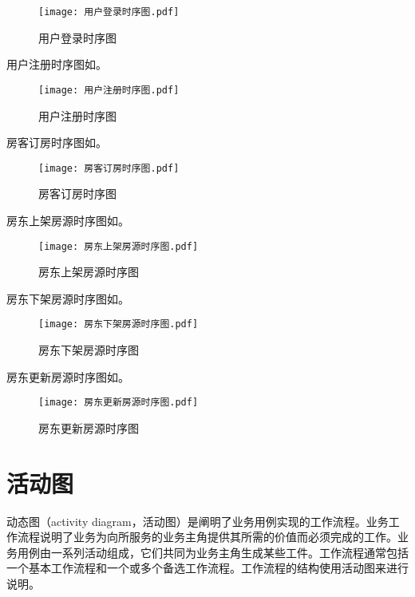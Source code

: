\documentclass[lang=cn,11pt,a4paper,cite=authoryear]{elegantpaper}
\begin{document}
\begin{figure}[]
    \centering
    \texttt{[image: 用户登录时序图.pdf]}
    \caption{用户登录时序图}
    \label{fig:用户登录时序图}
\end{figure}

用户注册时序图如。

\begin{figure}[]
    \centering
    \texttt{[image: 用户注册时序图.pdf]}
    \caption{用户注册时序图}
    \label{fig:用户注册时序图}
\end{figure}

房客订房时序图如。


\begin{figure}[]
    \centering
    \texttt{[image: 房客订房时序图.pdf]}
    \caption{房客订房时序图}
    \label{fig:房客订房时序图}
\end{figure}

房东上架房源时序图如。

\begin{figure}[]
    \centering
    \texttt{[image: 房东上架房源时序图.pdf]}
    \caption{房东上架房源时序图}
    \label{fig:房东上架房源时序图}
\end{figure}


房东下架房源时序图如。

\begin{figure}[]
    \centering
    \texttt{[image: 房东下架房源时序图.pdf]}
    \caption{房东下架房源时序图}
    \label{fig:房东下架房源时序图}
\end{figure}


房东更新房源时序图如。

\begin{figure}[]
    \centering
    \texttt{[image: 房东更新房源时序图.pdf]}
    \caption{房东更新房源时序图}
    \label{fig:房东更新房源时序图}
\end{figure}


\section{活动图}

动态图（activity diagram，活动图）是阐明了业务用例实现的工作流程。业务工作流程说明了业务为向所服务的业务主角提供其所需的价值而必须完成的工作。业务用例由一系列活动组成，它们共同为业务主角生成某些工件。工作流程通常包括一个基本工作流程和一个或多个备选工作流程。工作流程的结构使用活动图来进行说明。
\end{document}
